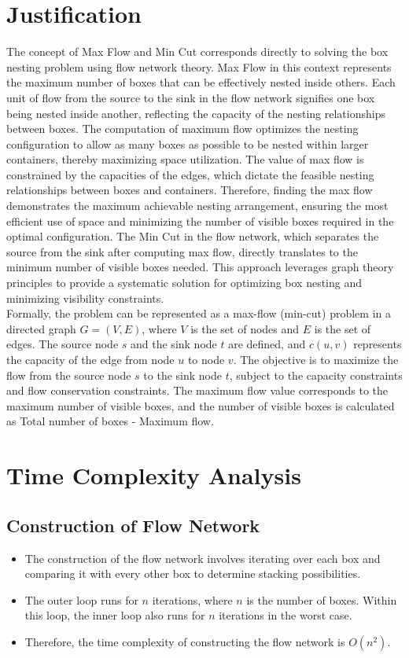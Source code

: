 \documentclass{article}
\begin{document}
\section*{Justification}

The concept of Max Flow and Min Cut corresponds directly to solving the box nesting problem using flow network theory. Max Flow in this context represents the maximum number of boxes that can be effectively nested inside others. Each unit of flow from the source to the sink in the flow network signifies one box being nested inside another, reflecting the capacity of the nesting relationships between boxes. The computation of maximum flow optimizes the nesting configuration to allow as many boxes as possible to be nested within larger containers, thereby maximizing space utilization. The value of max flow is constrained by the capacities of the edges, which dictate the feasible nesting relationships between boxes and containers. Therefore, finding the max flow demonstrates the maximum achievable nesting arrangement, ensuring the most efficient use of space and minimizing the number of visible boxes required in the optimal configuration. The Min Cut in the flow network, which separates the source from the sink after computing max flow, directly translates to the minimum number of visible boxes needed. This approach leverages graph theory principles to provide a systematic solution for optimizing box nesting and minimizing visibility constraints.
\\
Formally, the problem can be represented as a max-flow (min-cut) problem in a directed graph $G = (V, E)$, where $V$ is the set of nodes and $E$ is the set of edges. The source node $s$ and the sink node $t$ are defined, and $c(u, v)$ represents the capacity of the edge from node $u$ to node $v$. The objective is to maximize the flow from the source node $s$ to the sink node $t$, subject to the capacity constraints and flow conservation constraints. The maximum flow value corresponds to the maximum number of visible boxes, and the number of visible boxes is calculated as Total number of boxes - Maximum flow.

\section*{Time Complexity Analysis}

\subsection*{Construction of Flow Network}
\begin{itemize}
    \item The construction of the flow network involves iterating over each box and comparing it with every other box to determine stacking possibilities.
    \item The outer loop runs for $n$ iterations, where $n$ is the number of boxes. Within this loop, the inner loop also runs for $n$ iterations in the worst case.
    \item Therefore, the time complexity of constructing the flow network is $O(n^2)$.
\end{itemize}
\end{document}
